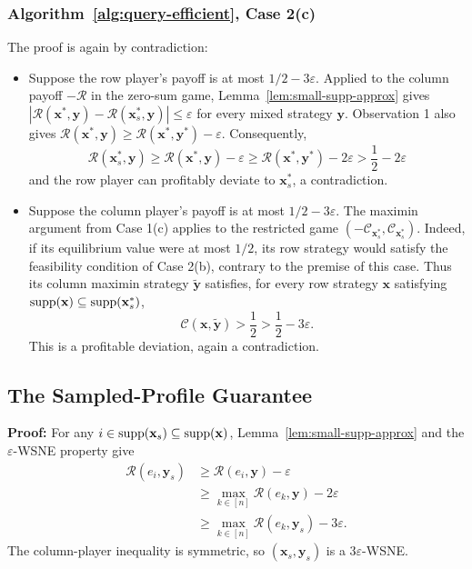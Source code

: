 \subsubsection{Algorithm~\ref{alg:query-efficient}, Case 2(c)}
\label{app:case-two-both-high}

The proof is again by contradiction:

\begin{itemize}
  \item Suppose the row player's payoff is at most \(1/2-3\varepsilon\). Applied to the column payoff \(-\mathcal{R}\) in the zero-sum game, Lemma~\ref{lem:small-supp-approx} gives
        \(|\mathcal{R}(\mathbf{x}^*,\mathbf{y})-\mathcal{R}(\mathbf{x}_s^*,\mathbf{y})|\le\varepsilon\) for every mixed strategy \(\mathbf{y}\). Observation 1 also gives
        \(\mathcal{R}(\mathbf{x}^*,\mathbf{y})\ge\mathcal{R}(\mathbf{x}^*,\mathbf{y}^*)-\varepsilon\).
        Consequently,
        \[
          \mathcal{R}(\mathbf{x}_s^*, \mathbf{y}) \ge \mathcal{R}(\mathbf{x}^*, \mathbf{y}) - \varepsilon \ge \mathcal{R}(\mathbf{x}^*, \mathbf{y}^*) - 2\varepsilon > \frac{1}{2} - 2\varepsilon
        \]
        and the row player can profitably deviate to \(\mathbf{x}_s^*\), a contradiction.

  \item Suppose the column player's payoff is at most \(1/2-3\varepsilon\). The maximin argument from Case 1(c) applies to the restricted game \((-\mathcal{C}_{\mathbf{x}_s^*},\mathcal{C}_{\mathbf{x}_s^*})\). Indeed, if its equilibrium value were at most \(1/2\), its row strategy would satisfy the feasibility condition of Case 2(b), contrary to the premise of this case. Thus its column maximin strategy \(\tilde{\mathbf{y}}\) satisfies, for every row strategy \(\mathbf{x}\) satisfying \(\operatorname{supp}(\mathbf{x}) \subseteq \operatorname{supp}(\mathbf{x}_s^*)\),
        \[
          \mathcal{C}(\mathbf{x},\tilde{\mathbf{y}})>\frac12>\frac12-3\varepsilon.
        \]
        This is a profitable deviation, again a contradiction.
\end{itemize}

\subsection{The Sampled-Profile Guarantee}
\label{app:sampled-wsne-proof}

\textbf{Proof:} For any \(i \in \operatorname{supp}(\mathbf{x}_s) \subseteq \operatorname{supp}(\mathbf{x})\), Lemma~\ref{lem:small-supp-approx} and the \(\varepsilon\)-WSNE property give
\begin{align*}
  \mathcal{R}(e_i, \mathbf{y}_s)
   & \ge \mathcal{R}(e_i, \mathbf{y})-\varepsilon                  \\
   & \ge \max_{k\in[n]}\mathcal{R}(e_k,\mathbf{y})-2\varepsilon    \\
   & \ge \max_{k\in[n]}\mathcal{R}(e_k,\mathbf{y}_s)-3\varepsilon.
\end{align*}
The column-player inequality is symmetric, so \((\mathbf{x}_s,\mathbf{y}_s)\) is a \(3\varepsilon\)-WSNE.

